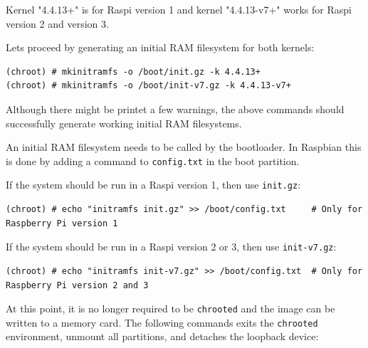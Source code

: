 Kernel "4.4.13+" is for \ac{Raspi} version 1 and kernel "4.4.13-v7+" works
for \ac{Raspi} version 2 and version 3.

Lets proceed by generating an initial \ac{RAM} filesystem for both kernels:



\begin{lstlisting}[]
(chroot) # mkinitramfs -o /boot/init.gz -k 4.4.13+
(chroot) # mkinitramfs -o /boot/init-v7.gz -k 4.4.13-v7+
\end{lstlisting}
\FloatBarrier
\vspace{-5mm}


Although there might be printet a few warnings, the above commands should successfully
generate working initial \ac{RAM} filesystems. 

An initial \ac{RAM} filesystem needs to be called by the bootloader. In Raspbian
this is done by adding a command to \texttt{config.txt} in the boot partition.

If the system should be run in a \ac{Raspi} version 1, then use \texttt{init.gz}:
\begin{lstlisting}[]
(chroot) # echo "initramfs init.gz" >> /boot/config.txt     # Only for Raspberry Pi version 1
\end{lstlisting}
\FloatBarrier
\vspace{-5mm}

If the system should be run in a \ac{Raspi} version 2 or 3, then use \texttt{init-v7.gz}:
\begin{lstlisting}[]
(chroot) # echo "initramfs init-v7.gz" >> /boot/config.txt  # Only for Raspberry Pi version 2 and 3
\end{lstlisting}
\FloatBarrier
\vspace{-5mm}

At this point, it is no longer required to be \texttt{chrooted} and the image
can be written to a memory card. The following commands exits the \texttt{chrooted}
environment, unmount all partitions, and detaches the loopback device:

